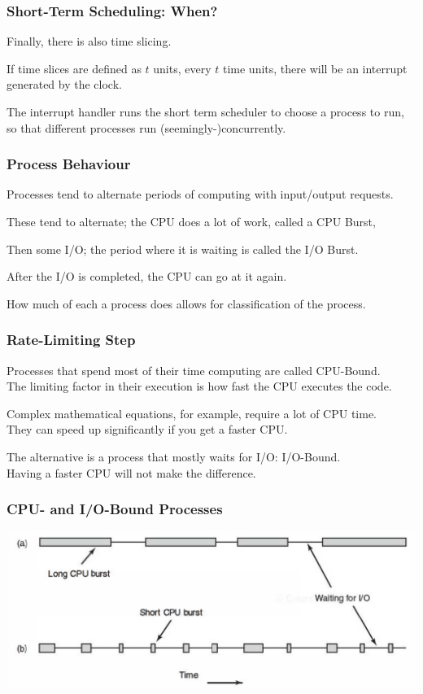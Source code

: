 \begin{frame}
\frametitle{Short-Term Scheduling: When?}

Finally, there is also time slicing. 

If time slices are defined as $t$ units, every $t$ time units, there will be an interrupt generated by the clock.

The interrupt handler runs the short term scheduler to choose a process to run, so that different processes run (seemingly-)concurrently.


\end{frame}

\begin{frame}
\frametitle{Process Behaviour}

Processes tend to alternate periods of computing with input/output requests. 

These tend to alternate; the CPU does a lot of work, called a \alert{CPU Burst},

Then some I/O; the period where it is waiting is called the \alert{I/O Burst}. 

After the I/O is completed, the CPU can go at it again. 

How much of each a process does allows for classification of the process.


\end{frame}

\begin{frame}
\frametitle{Rate-Limiting Step}

Processes that spend most of their time computing are called \alert{CPU-Bound}.\\
\quad  The limiting factor in their execution is how fast the CPU executes the code. 

Complex mathematical equations, for example, require a lot of CPU time.\\
\quad They can speed up significantly if you get a faster CPU. 

The alternative is a process that mostly waits for I/O: \alert{I/O-Bound}.\\ 
\quad Having a faster CPU will not make the difference.


\end{frame}

\begin{frame}
\frametitle{CPU- and I/O-Bound Processes}

\begin{center}
\includegraphics[width=\textwidth]{images/cpu-io-bound.png}
\end{center}


\end{frame}

